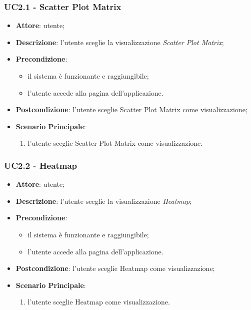     \subsubsection{UC2.1 - Scatter Plot Matrix}
    \label{uc2.1}
    
    \begin{itemize}
    \item \textbf{Attore}: utente;
    \item \textbf{Descrizione}: l'utente sceglie la visualizzazione \emph{Scatter Plot Matrix};
    \item \textbf{Precondizione}:
    \begin{itemize}
        \item il sistema è funzionante e raggiungibile;
        \item l'utente accede alla pagina dell'applicazione.
    \end{itemize}
    \item \textbf{Postcondizione}: l'utente sceglie Scatter Plot Matrix come visualizzazione;
    \item \textbf{Scenario Principale}: 
        \begin{enumerate}
            \item l'utente sceglie Scatter Plot Matrix come visualizzazione.
        \end{enumerate}
    \end{itemize}
    
    \subsubsection{UC2.2 - Heatmap}
    \label{uc2.2}
    
    \begin{itemize}
    \item \textbf{Attore}: utente;
    \item \textbf{Descrizione}: l'utente sceglie la visualizzazione \emph{Heatmap};
    \item \textbf{Precondizione}:
    \begin{itemize}
        \item il sistema è funzionante e raggiungibile;
        \item l'utente accede alla pagina dell'applicazione.
    \end{itemize}
    \item \textbf{Postcondizione}: l'utente sceglie Heatmap come visualizzazione;
    \item \textbf{Scenario Principale}: 
        \begin{enumerate}
            \item l'utente sceglie Heatmap come visualizzazione.
        \end{enumerate}
    \end{itemize}
    
